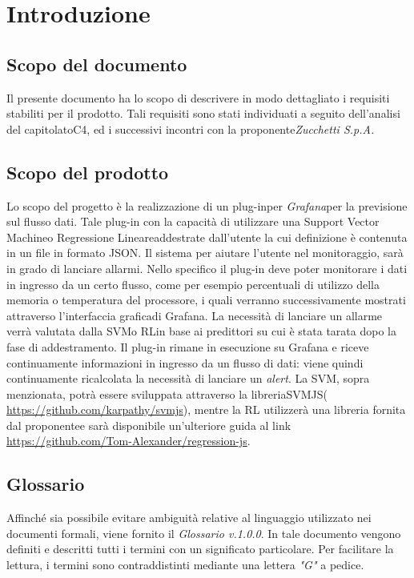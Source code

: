 \section{Introduzione}
	\subsection{Scopo del documento}
		Il presente documento ha lo scopo di descrivere in modo dettagliato i requisiti stabiliti per il prodotto. Tali requisiti sono stati individuati a seguito dell'analisi del capitolato\glo C4, ed i successivi incontri con la proponente\glo \emph{Zucchetti S.p.A.}

	
\subsection{Scopo del prodotto}
   Lo scopo del progetto è la realizzazione di un plug-in\glo per \emph{Grafana}\glo per la previsione sul flusso dati\glo. Tale plug-in con la capacità di utilizzare una Support Vector Machine\glo o Regressione Lineare\glo addestrate dall'utente la cui definizione è contenuta in un file in formato JSON\glo. Il sistema per aiutare l’utente nel monitoraggio, sarà in grado di lanciare allarmi.
Nello specifico il plug-in deve poter monitorare i dati in ingresso da un certo flusso, come per esempio percentuali di utilizzo della memoria o temperatura del processore, i quali verranno successivamente mostrati attraverso l'interfaccia grafica\glo di Grafana.
La necessità di lanciare un allarme verrà valutata dalla SVM\glo o RL\glo in base ai predittori su cui è stata tarata dopo la fase di addestramento.
Il plug-in rimane in esecuzione su Grafana e riceve continuamente informazioni in ingresso da un flusso di dati: viene quindi continuamente ricalcolata la necessità di lanciare un \emph{alert}\glo.
La SVM, sopra menzionata, potrà essere sviluppata attraverso la libreria\glo SVMJS\glo (\url{ https://github.com/karpathy/svmjs}), mentre la RL utilizzerà una libreria fornita dal proponente\glo e sarà disponibile un’ulteriore guida al link \url{https://github.com/Tom-Alexander/regression-js}.

	
	\subsection{Glossario}
		Affinché sia possibile evitare ambiguità relative al linguaggio utilizzato nei documenti formali, viene fornito il \emph{Glossario v.1.0.0}. In tale documento vengono definiti e descritti tutti i termini con un significato particolare. Per facilitare la lettura, i termini sono contraddistinti mediante una lettera \emph{"G"} a pedice.
		
